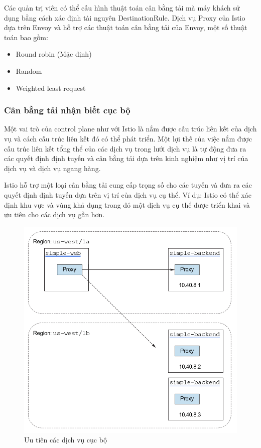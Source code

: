 \documentclass[12pt,a4paper]{report}
\begin{document}
Các quản trị viên có thể cấu hình thuật toán cân bằng tải mà máy khách sử dụng bằng cách xác định tài nguyên DestinationRule. Dịch vụ Proxy của Istio dựa trên Envoy và hỗ trợ các thuật toán cân bằng tải của Envoy, một số thuật toán bao gồm:
\begin{itemize}
	\item Round robin (Mặc định)
	\item Random
	\item Weighted least request
\end{itemize}
			\subsubsection{Cân bằng tải nhận biết cục bộ}
\hspace{0.6cm}Một vai trò của control plane như với Istio là nắm được cấu trúc liên kết của dịch vụ và cách cấu trúc liên kết đó có thể phát triển. Một lợi thế của việc nắm được cấu trúc liên kết tổng thể của các dịch vụ trong lưới dịch vụ là tự động đưa ra các quyết định định tuyến và cân bằng tải dựa trên kinh nghiệm như vị trí của dịch vụ và dịch vụ ngang hàng.

Istio hỗ trợ một loại cân bằng tải cung cấp trọng số cho các tuyến và đưa ra các quyết định định tuyến dựa trên vị trí của dịch vụ cụ thể. Ví dụ: Istio có thể xác định khu vực và vùng khả dụng trong đó một dịch vụ cụ thể được triển khai và ưu tiên cho các dịch vụ gần hơn.
\begin{figure}[h]
	\centering
	\includegraphics[width=0.7\linewidth]{Pics/2.2.3-p3}
	\caption{Ưu tiên các dịch vụ cục bộ}
	\label{fig:2.2.3-3}
\end{figure}
\newpage
\end{document}
